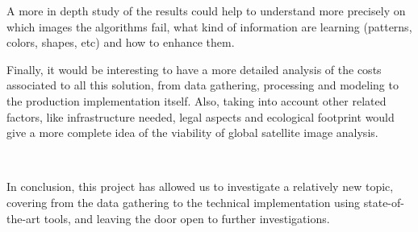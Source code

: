 A more in depth study of the results could help to understand more precisely on which images the algorithms fail, what kind of information are learning (patterns, colors, shapes, etc) and how to enhance them.

Finally, it would be interesting to have a more detailed analysis of the costs associated to all this solution, from data gathering, processing and modeling to the production implementation itself. Also, taking into account other related factors, like infrastructure needed, legal aspects and ecological footprint \parencite{Strubell2019} would give a more complete idea of the viability of global satellite image analysis.

\

In conclusion, this project has allowed us to investigate a relatively new topic, covering from the data gathering to the technical implementation using state-of-the-art tools, and leaving the door open to further investigations.
